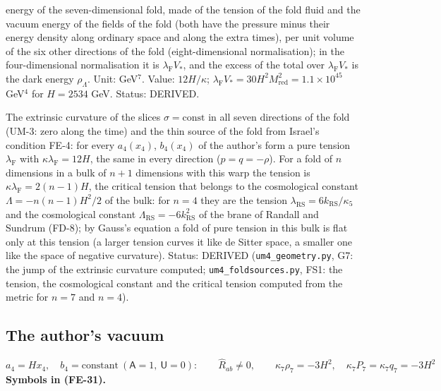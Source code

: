 \documentclass[
  10pt,
]{article}
\begin{document}
\begin{itemize}
  energy of the seven-dimensional fold, made of the tension of the fold
  fluid and the vacuum energy of the fields of the fold (both have the
  pressure minus their energy density along ordinary space and along the
  extra times), per unit volume of the six other directions of the fold
  (eight-dimensional normalisation); in the four-dimensional
  normalisation it is \(\lambda_{\mathrm{F}}V_*\), and the excess of the
  total over \(\lambda_{\mathrm{F}}V_*\) is the dark energy
  \(\rho_\Lambda\). Unit: GeV\(^7\). Value: \(12H/\kappa\);
  \(\lambda_{\mathrm{F}}V_* = 30H^2M_{\mathrm{red}}^2 = 1.1\times10^{45}\)
  GeV\(^4\) for \(H = 2534\) GeV. Status: DERIVED.
\end{itemize}

The extrinsic curvature of the slices \(\sigma = \text{const}\) in all
seven directions of the fold (UM-3: zero along the time) and the thin
source of the fold from Israel's condition FE-4: for every \(a_4(x_4)\),
\(b_4(x_4)\) of the author's form a pure tension
\(\lambda_{\mathrm{F}}\) with \(\kappa\lambda_{\mathrm{F}} = 12H\), the
same in every direction (\(p = q = -\rho\)). For a fold of \(n\)
dimensions in a bulk of \(n + 1\) dimensions with this warp the tension
is \(\kappa\lambda_{\mathrm{F}} = 2(n - 1)H\), the critical tension that
belongs to the cosmological constant \(\Lambda = -n(n - 1)H^2/2\) of the
bulk: for \(n = 4\) they are the tension
\(\lambda_{\mathrm{RS}} = 6k_{\mathrm{RS}}/\kappa_5\) and the
cosmological constant \(\Lambda_{\mathrm{RS}} = -6k_{\mathrm{RS}}^2\) of
the brane of Randall and Sundrum (FD-8); by Gauss's equation a fold of
pure tension in this bulk is flat only at this tension (a larger tension
curves it like de Sitter space, a smaller one like the space of negative
curvature). Status: DERIVED (\texttt{um4\_geometry.py}, G7: the jump of
the extrinsic curvature computed; \texttt{um4\_foldsources.py}, FS1: the
tension, the cosmological constant and the critical tension computed
from the metric for \(n = 7\) and \(n = 4\)).

\hypertarget{the-authors-vacuum}{%
\subsection{The author's vacuum}\label{the-authors-vacuum}}

\[
a_4 = Hx_4,\quad b_4 = \text{constant}\ (\mathsf{A} = 1,\ \mathsf{U} = 0):\qquad
\hat R_{ab} \ne 0,\qquad \kappa_7\rho_7 = -3H^2,\quad \kappa_7P_7 = \kappa_7q_7 = -3H^2 \tag{FE-31}
\] \textbf{Symbols in (FE-31).}
\end{document}

